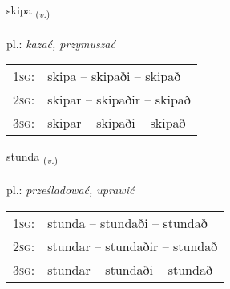\documentclass[frontgrid, backgrid]{flacards}\usepackage[]{graphicx}\usepackage[]{xcolor}
\begin{document}
\renewcommand{\flhead}{\vskip5pt \fboxsep=0pt {\small\bfseries\footnotesize Sagnorð | czasownik}}
\renewcommand{\fcfoot}{\vskip5pt \fboxsep=0pt \hspace{2pt}{\small\bfseries\footnotesize 1K}}

\renewcommand{\blhead}{\vskip5pt {\small\bfseries\footnotesize Sagnorð | czasownik }}
\renewcommand{\bcfoot}{\vskip5pt \hspace{2pt}{\small\bfseries\footnotesize 1K}}


{skipa \small{\textsubscript{(\textit{v.})}} \\[1ex] %
\textphonetic{[scɪːpa]} \\
pl.: \emph{kazać, przymuszać} \\  [2ex]
\renewcommand*{\arraystretch}{0.8}
\begin{tabular}{p{1cm}l}
\textsc{1sg}: & skipa -- skipaði -- skipað \\ 
\textsc{2sg}: & skipar -- skipaðir -- skipað \\ 
\textsc{3sg}: & skipar -- skipaði -- skipað \\ 
\end{tabular}
}

\renewcommand{\flhead}{\vskip5pt \fboxsep=0pt {\small\bfseries\footnotesize Sagnorð | czasownik}}
\renewcommand{\fcfoot}{\vskip5pt \fboxsep=0pt \hspace{2pt}{\small\bfseries\footnotesize 1K}}

\renewcommand{\blhead}{\vskip5pt {\small\bfseries\footnotesize Sagnorð | czasownik }}
\renewcommand{\bcfoot}{\vskip5pt \hspace{2pt}{\small\bfseries\footnotesize 1K}}


{stunda \small{\textsubscript{(\textit{v.})}} \\[1ex] %
\textphonetic{[stʏnta]} \\
pl.: \emph{prześladować, uprawić} \\  [2ex]
\renewcommand*{\arraystretch}{0.8}
\begin{tabular}{p{1cm}l}
\textsc{1sg}: & stunda -- stundaði -- stundað \\ 
\textsc{2sg}: & stundar -- stundaðir -- stundað \\ 
\textsc{3sg}: & stundar -- stundaði -- stundað \\ 
\end{tabular}
}
\end{document}
